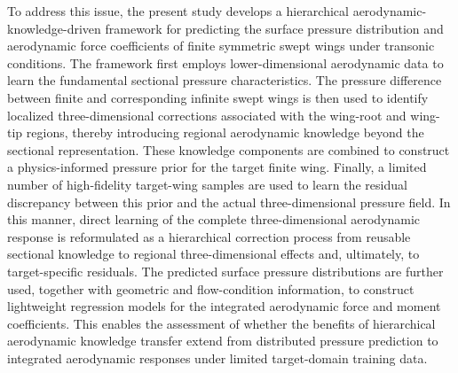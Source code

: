To address this issue, the present study develops a hierarchical aerodynamic-knowledge-driven framework for predicting the surface pressure distribution and aerodynamic force coefficients of finite symmetric swept wings under transonic conditions. The framework first employs lower-dimensional aerodynamic data to learn the fundamental sectional pressure characteristics. The pressure difference between finite and corresponding infinite swept wings is then used to identify localized three-dimensional corrections associated with the wing-root and wing-tip regions, thereby introducing regional aerodynamic knowledge beyond the sectional representation. These knowledge components are combined to construct a physics-informed pressure prior for the target finite wing. Finally, a limited number of high-fidelity target-wing samples are used to learn the residual discrepancy between this prior and the actual three-dimensional pressure field. In this manner, direct learning of the complete three-dimensional aerodynamic response is reformulated as a hierarchical correction process from reusable sectional knowledge to regional three-dimensional effects and, ultimately, to target-specific residuals. 
The predicted surface pressure distributions are further used, together with geometric and flow-condition information, to construct lightweight regression models for the integrated aerodynamic force and moment coefficients. This enables the assessment of whether the benefits of hierarchical aerodynamic knowledge transfer extend from distributed pressure prediction to integrated aerodynamic responses under limited target-domain training data.